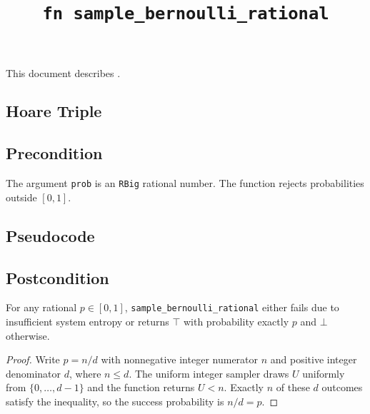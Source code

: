 \documentclass{article}
\title{\texttt{fn sample\_bernoulli\_rational}}
\author{\MichaelShoemateAuthor}
\begin{document}
\maketitle

\contrib

This document describes .

\subsection{Hoare Triple}
\subsection*{Precondition}
The argument \texttt{prob} is an \texttt{RBig} rational number.
The function rejects probabilities outside $[0,1]$.

\subsection*{Pseudocode}


\subsection*{Postcondition}
\begin{theorem}
For any rational $p\in[0,1]$, \texttt{sample\_bernoulli\_rational}
either fails due to insufficient system entropy or returns
$\top$ with probability exactly $p$ and $\bot$ otherwise.
\end{theorem}

\begin{proof}
Write $p=n/d$ with nonnegative integer numerator $n$ and
positive integer denominator $d$, where $n\le d$.
The uniform integer sampler draws $U$ uniformly from
$\{0,\ldots,d-1\}$ and the function returns $U<n$.
Exactly $n$ of these $d$ outcomes satisfy the inequality,
so the success probability is $n/d=p$.
\end{proof}
\end{document}
